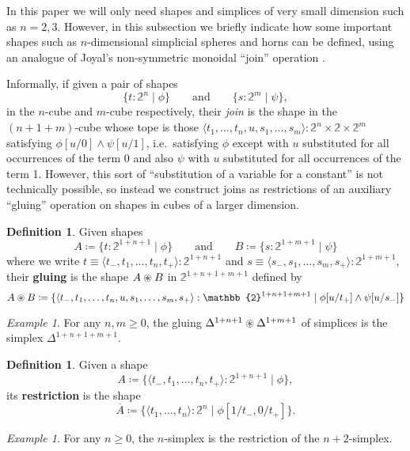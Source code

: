 \documentclass{amsart}
\theoremstyle{plain}
\theoremstyle{definition}
\newtheorem{defn}[thm]{Definition}
\theoremstyle{remark}
\newtheorem{ex}[thm]{Example}
\numberwithin{equation}{section}
\newcommand{\jdeq}{\equiv}
\newcommand{\defeq}{\coloneqq}
\newcommand{\sh}[2]{\{#1\mid #2\}}
\newcommand{\restr}[1]{\overline{#1}}
\newcommand{\pair}[1]{\langle #1\rangle}
\newcommand{\two}{\mathbb{2}}
\begin{document}
In this paper we will only need shapes and simplices of very small dimension such as $n=2,3$.
However, in this subsection we briefly indicate how some important shapes such as $n$-dimensional simplicial spheres and horns can be defined, using an analogue of Joyal's non-symmetric monoidal ``join'' operation \cite{joyal-quasi}.

Informally, if given a pair of shapes
\[  \sh{t:\two^n}{\phi} \qquad\text{and}\qquad  \sh{s:\two^m}{\psi}, \]
in the $n$-cube and $m$-cube respectively, their \emph{join} is the shape in the $(n+1+m)$-cube whose tope is those $\pair{t_1,\dots,t_n,u, s_1,\ldots, s_m}:\two^n \times \two \times \two^m$ satisfying $\phi[u/0] \wedge \psi[u/1]$, i.e.~satisfying $\phi$ except with $u$ substituted for all occurrences of the term $0$ and also $\psi$ with $u$ substituted for all occurrences of the term 1.  However, this sort of ``substitution of a variable for a constant'' is not technically possible, so instead we construct joins as restrictions of an auxiliary ``gluing'' operation on shapes in cubes of a larger dimension.

\begin{defn}
Given shapes 
\begin{equation}
  A \defeq \sh{t:\two^{1+n+1}}{\phi} \qquad\text{and}\qquad  B \defeq\sh{s:\two^{1+m+1}}{\psi} \label{eq:gluing-data}
\end{equation}
where we write $t \jdeq \pair{t_-,t_1,\ldots, t_n,t_+} : \two^{1+n+1}$ and $s \jdeq \pair{s_-,s_1,\ldots, s_m,s_+} : \two^{1+m+1}$,
their \textbf{gluing} is the shape $A \oast B$ in $\two^{1+n+1+m+1}$ defined by
\[ A \oast B \defeq \sh{\pair{t_-, t_1, \ldots, t_{n}, u, s_1,\ldots, s_{m}, s_+} : \two^{1+n+1+m+1}}{\phi[u/t_{+}] \land \psi[u/s_-]} \]
\end{defn}

\begin{ex}
  For any $n,m\geq 0$, the gluing $\Delta^{1+n+1} \oast \Delta^{1+m+1}$ of simplices is the simplex $\Delta^{1+n+1+m+1}$.
\end{ex}

\begin{defn}
Given a shape 
\[  A \defeq \sh{\pair{t_-,t_1,\ldots,t_n,t_+}:\two^{1+n+1}}{\phi}, \]
its \textbf{restriction} is the shape
\[ \restr{A} \defeq \sh{\pair{t_1,\ldots,t_n}:\two^{n}}{\phi[1/t_-,0/t_+]}.
\]
\end{defn}

\begin{ex} For any $n \geq 0$, the $n$-simplex is the restriction of the $n+2$-simplex. 
\end{ex}
\end{document}
